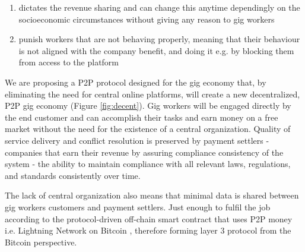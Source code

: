 \documentclass{article}
\begin{document}
\begin{enumerate}
\item dictates the revenue sharing and can change this anytime dependingly on the socioeconomic circumstances without giving any reason to gig workers
\item punish workers that are not behaving properly, meaning that their behaviour is not aligned with the company benefit, and doing it e.g. by blocking them from access to the platform
\end{enumerate}

We are proposing a P2P protocol designed for the gig economy that, by eliminating the need for central online platforms, will create a new decentralized, P2P gig economy (Figure \ref{fig:decent}). Gig workers will be engaged directly by the end customer and can accomplish their tasks and earn money on a free market without the need for the existence of a central organization. Quality of service delivery and conflict resolution is preserved by payment settlers - companies that earn their revenue by assuring compliance consistency of the system - the ability to maintain compliance with all relevant laws, regulations, and standards consistently over time. 

The lack of central organization also means that minimal data is shared between gig workers customers and payment settlers. Just enough to fulfil the job according to the protocol-driven off-chain smart contract that uses P2P money i.e. Lightning Network \cite{poon2016bitcoin} on Bitcoin \cite{nakamoto2009bitcoin}, therefore forming layer 3 protocol from the Bitcoin perspective.
\end{document}
